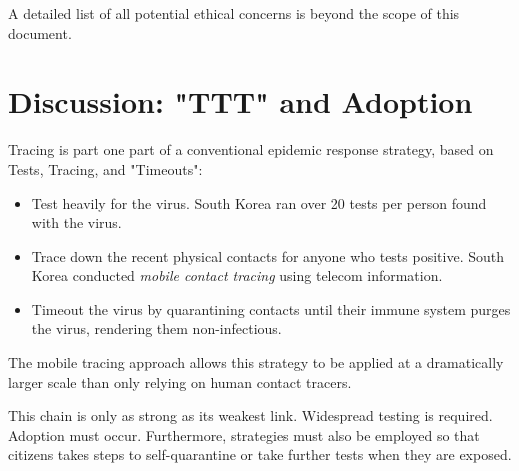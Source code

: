 \documentclass{article}
\begin{document}
A detailed list of all potential ethical concerns is beyond the scope of this document. 

\section{Discussion: "TTT" and Adoption}
Tracing is part one part of a conventional epidemic response strategy, based on Tests, Tracing, and "Timeouts": 
\begin{itemize}
\item Test heavily for the virus.  South Korea ran over 20 tests per person found with the virus. 
\item Trace down the recent physical contacts for anyone who tests positive.  South Korea conducted \emph{mobile contact tracing} using telecom information.
\item Timeout the virus by quarantining contacts until their immune system purges the virus, rendering them non-infectious.
\end{itemize}
The mobile tracing approach allows this strategy to be applied at a dramatically larger scale than only relying on human contact tracers.  

This chain is only as strong as its weakest link.  Widespread testing is required.  Adoption must occur. Furthermore, strategies must also be employed so that citizens takes steps to self-quarantine or take further tests when they are exposed.
\end{document}
